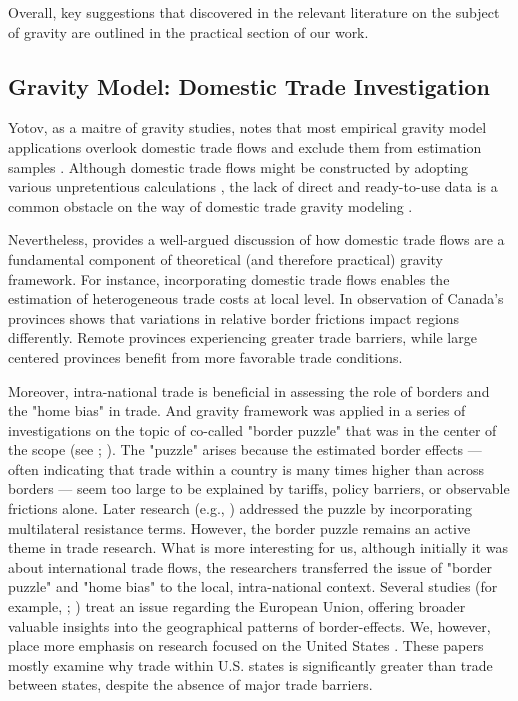 Overall, key suggestions that discovered in the relevant literature on the subject of gravity are outlined in the practical section of our work.

\subsection{Gravity Model: Domestic Trade Investigation}


Yotov, as a maitre of gravity studies, notes that most empirical gravity model applications overlook domestic trade flows and exclude them from estimation samples \parencite{yotov2022role}. Although domestic trade flows might be constructed by adopting various unpretentious calculations \parencite{campos2021structural}, the lack of direct and ready-to-use data is a common obstacle on the way of domestic trade gravity modeling \parencite{yotov2022role}.

Nevertheless, \textcite{yotov2022role} provides a well-argued discussion of how domestic trade flows are a fundamental component of theoretical (and therefore practical) gravity framework. For instance, incorporating domestic trade flows enables the estimation of heterogeneous trade costs at local level. In \textcite{agnosteva2019intra} observation of Canada’s provinces shows that variations in relative border frictions impact regions differently. Remote provinces experiencing greater trade barriers, while large centered provinces benefit from more favorable trade conditions. 

Moreover, intra-national trade is beneficial in assessing the role of borders and the "home bias" in trade. And gravity framework was applied in a series of investigations on the topic of co-called "border puzzle" that was in the center of the scope (see \cite{mccallum1995national}; \cite{wolf2000intranational}). The "puzzle" arises because the estimated border effects — often indicating that trade within a country is many times higher than across borders — seem too large to be explained by tariffs, policy barriers, or observable frictions alone. Later research (e.g., \cite{anderson2003gravity}) addressed the puzzle by incorporating multilateral resistance terms. However, the border puzzle remains an active theme in trade research. What is more interesting for us, although initially it was about international trade flows, the researchers transferred the issue of "border puzzle" and "home bias" to the local, intra-national context. Several studies (for example, \cite{nitsch2000national}; \cite{chen2004intra}) treat an issue regarding the European Union, offering broader valuable insights into the geographical patterns of border-effects. We, however, place more emphasis on research focused on the United States \parencite{hillberry2003intranational, millimet2007state, coughlin2013international, crafts2014geography}. These papers mostly examine why trade within U.S. states is significantly greater than trade between states, despite the absence of major trade barriers.

